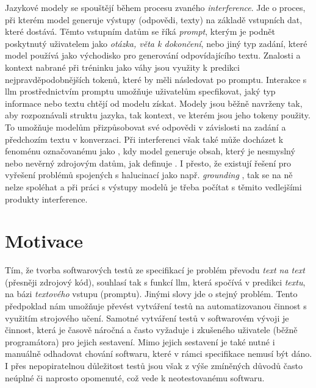 \documentclass[czech, ma, kiv, he, iso690numb, pdf, viewonly]{fasthesis}
\begin{document}
    Jazykové modely se spouštějí během procesu zvaného \textit{interference}. Jde o proces, při kterém model generuje výstupy (odpovědi, texty) na základě vstupních dat, které dostává. Těmto vstupním datům se říká \textit{prompt}, kterým je podnět poskytnutý uživatelem jako \textit{otázka, věta k dokončení}, nebo jiný typ zadání, které model používá jako východisko pro generování odpovídajícího textu. Znalosti a kontext nabrané při tréninku jako váhy jsou využity k predikci nejpravděpodobnějších tokenů, které by měli následovat po promptu. Interakce s \Gls{llm} prostřednictvím promptu umožňuje uživatelům specfikovat, jaký typ informace nebo textu chtějí od modelu získat. Modely jsou běžně navrženy tak, aby rozpoznávali struktu jazyka, tak kontext, ve kterém jsou jeho tokeny použity. To umožňuje modelům přizpůsobovat své odpovědi v závislosti na zadání a předchozím textu v konverzaci. \cite{pasekprazak2022} Při interferenci však také může docházet k fenoménu označovanému jako , kdy model generuje obsah, který je nesmyslný nebo nevěrný zdrojovým datům, jak definuje \cite{filippova2020controlled}. I přesto, že existují řešení pro vyřešení problémů spojených s halucinací jako např. \textit{grounding} \cite{microsoft2023grounding}, tak se na ně nelze spoléhat a při práci s výstupy modelů je třeba počítat s těmito vedlejšími produkty interference.

    \section{Motivace} \label{sec:motivation}

    Tím, že tvorba softwarových testů ze specifikací je problém převodu \emph{text na text} (přesněji zdrojový kód), souhlasí tak s funkcí  \Gls{llm}, která spočívá v predikci \emph{textu}, na bázi \emph{textového} vstupu (promptu). Jinými slovy jde o stejný problém. Tento předpoklad nám umožňuje převést vytváření testů na automatizovanou činnost s využitím strojového učení. Samotné vytváření testů v softwarovém vývoji je činnost, která je časově náročná a často vyžaduje i zkušeného uživatele (běžně programátora) pro jejich sestavení. Mimo jejich sestavení je také nutné i manuálně odhadovat chování softwaru, které v rámci specifikace nemusí být dáno. I přes nepopiratelnou důležitost testů jsou však z výše zmíněných důvodů často neúplné či naprosto opomenuté, což vede k neotestovanému softwaru.
\end{document}
